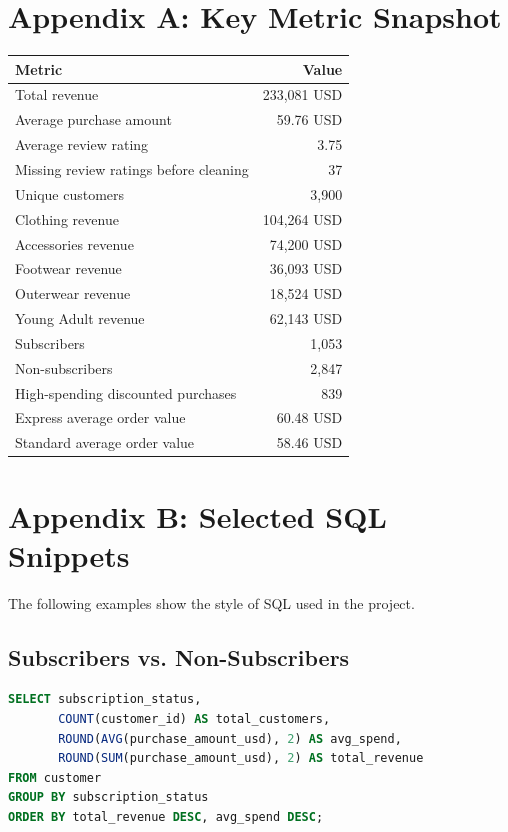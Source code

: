 \documentclass[12pt,a4paper]{article}
\begin{document}
\appendix

\section{Appendix A: Key Metric Snapshot}
\begin{longtable}{p{}r}
\toprule
\textbf{Metric} & \textbf{Value} \\
\midrule
Total revenue & 233,081 USD \\
Average purchase amount & 59.76 USD \\
Average review rating & 3.75 \\
Missing review ratings before cleaning & 37 \\
Unique customers & 3,900 \\
Clothing revenue & 104,264 USD \\
Accessories revenue & 74,200 USD \\
Footwear revenue & 36,093 USD \\
Outerwear revenue & 18,524 USD \\
Young Adult revenue & 62,143 USD \\
Subscribers & 1,053 \\
Non-subscribers & 2,847 \\
High-spending discounted purchases & 839 \\
Express average order value & 60.48 USD \\
Standard average order value & 58.46 USD \\
\bottomrule
\end{longtable}

\section{Appendix B: Selected SQL Snippets}
The following examples show the style of SQL used in the project.

\subsection{Subscribers vs. Non-Subscribers}
\begin{lstlisting}[language=SQL]
SELECT subscription_status,
       COUNT(customer_id) AS total_customers,
       ROUND(AVG(purchase_amount_usd), 2) AS avg_spend,
       ROUND(SUM(purchase_amount_usd), 2) AS total_revenue
FROM customer
GROUP BY subscription_status
ORDER BY total_revenue DESC, avg_spend DESC;
\end{lstlisting}
\end{document}
